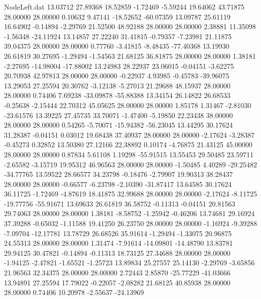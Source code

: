 \begin{filecontents}{NodeLeft.dat}
  13.03712   27.89368   18.52859    -1.72469   -5.59244   19.64062   43.71875   28.00000   28.00000    0.10632    9.47141  -18.52652  -60.07359
  13.09787   25.61119   16.64902    -0.14894   -2.29769   21.52500   48.92188   28.00000   28.00000    2.38881   11.35098   -1.56348  -24.11924
  13.14857   27.22240   31.41815    -0.79357   -7.23981   21.11875   39.04375   28.00000   28.00000    0.77760   -3.41815   -8.48435  -77.40368
  13.19930   26.61819   30.27695    -1.29494   -1.54563   21.68125   36.81875   28.00000   28.00000    1.38181   -2.27695  -14.98004  -17.88002
  13.24983   28.22937   23.06015    -0.04151   -3.62275   20.70938   42.97813   28.00000   28.00000   -0.22937    4.93985   -0.45783  -39.96075
  13.29053   27.25594   20.30762    -3.12138   -5.27013   21.29688   48.15937   28.00000   28.00000    0.74406    7.69238  -33.09878  -55.88388
  13.34154   26.14822   26.68533    -0.25638   -2.15444   22.70312   45.05625   28.00000   28.00000    1.85178    1.31467   -2.81030  -23.61576
  13.39225   27.45735   33.70071    -1.47400   -5.19850   22.23438   38.00000   28.00000   28.00000    0.54265   -5.70071  -15.94382  -56.23045
  13.44295   30.17624   31.28387    -0.04151    0.03012   19.68438   37.40937   28.00000   28.00000   -2.17624   -3.28387   -0.45273    0.32852
  13.50380   27.12166   22.38892     0.10174   -4.76875   21.43125   45.00000   28.00000   28.00000    0.87834    5.61108    1.19298  -55.91515
  13.55453   29.50485   23.59711    -2.65582   -3.15719   19.95312   46.96563   28.00000   28.00000   -1.50485    4.40289  -29.25482  -34.77765
  13.59522   28.66577   34.23798    -0.18476   -2.79907   19.90313   38.28437   28.00000   28.00000   -0.66577   -6.23798   -2.10390  -31.87417
  13.64585   30.17624   36.11725    -1.72469   -4.87619   18.41875   32.99688   28.00000   28.00000   -2.17624   -8.11725  -19.77756  -55.91671
  13.69633   26.61819   36.58752    -0.11313   -0.04151   20.81563   29.74063   28.00000   28.00000    1.38181   -8.58752   -1.25942   -0.46206
  13.74681   29.16924   37.39288    -0.65032   -1.11588   19.41250   26.23750   28.00000   28.00000   -1.16924   -9.39288   -7.09704  -12.17781
  13.78729   26.68526   35.91614    -1.29494   -1.33075   20.96875   24.55313   28.00000   28.00000    1.31474   -7.91614  -14.09801  -14.48790
  13.83781   29.94125   30.47821    -0.14894   -0.11313   18.73125   27.34688   28.00000   28.00000   -1.94125   -2.47821   -1.65521   -1.25723
  13.89834   25.27557   25.14130    -2.29769   -3.65856   21.96563   32.34375   28.00000   28.00000    2.72443    2.85870  -25.77229  -41.03666
  13.94891   27.25594   17.79022    -0.22057   -2.08282   21.68125   40.85938   28.00000   28.00000    0.74406   10.20978   -2.55637  -24.13969

\end{filecontents}
